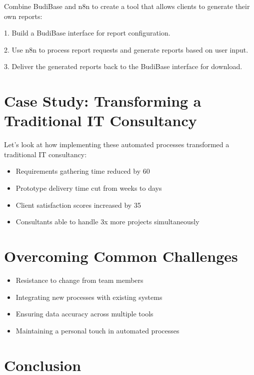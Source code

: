 Combine BudiBase and n8n to create a tool that allows clients to generate their own reports:

1. Build a BudiBase interface for report configuration.

2. Use n8n to process report requests and generate reports based on user input.

3. Deliver the generated reports back to the BudiBase interface for download.


\section{Case Study: Transforming a Traditional IT Consultancy}

Let's look at how implementing these automated processes transformed a traditional IT consultancy:

\begin{itemize}
    \item Requirements gathering time reduced by 60%
    \item Prototype delivery time cut from weeks to days
    \item Client satisfaction scores increased by 35%
    \item Consultants able to handle 3x more projects simultaneously
\end{itemize}


\section{Overcoming Common Challenges}

\begin{itemize}
    \item Resistance to change from team members
    \item Integrating new processes with existing systems
    \item Ensuring data accuracy across multiple tools
    \item Maintaining a personal touch in automated processes
\end{itemize}

\section{Conclusion}

